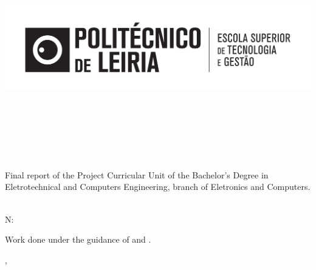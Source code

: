 
\begin{titlepage}

\begin{center}

\hfill

\includegraphics[width=\textwidth]{Covers/estg_h.pdf} \\

\bigskip
\large
\myFaculty \\
\mySchool \\ 
\myDepartment \\
\myDegree \\



\begingroup
\color{Maroon}

\vspace{2cm}

\spacedallcaps{\myTitle} \\ \bigskip %
\endgroup

\vspace{1cm}


\noindent Final report of the Project Curricular Unit of the Bachelor’s Degree in Eletrotechnical and Computers Engineering, branch of Eletronics and Computers.

\vspace{1cm}

\spacedlowsmallcaps{\myNameOne}\\
N: \myNumber \\
\bigskip %

\vfill

\end{center}

\begin{normalsize}
    
\noindent Work done under the guidance of \myProfOne \ProfLuisEmail and \myProfTwo \ProfMonicaEmail.

\end{normalsize}
\vspace{1cm}

\begin{center}

\myLocation, \myTime\ %
    
\end{center}




\end{titlepage}

\cleardoublepage